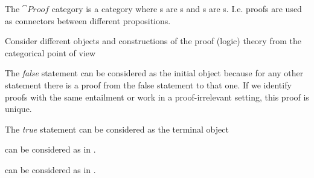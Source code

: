 \begin{definition}
\label{def:proof_category}
The $\cat{Proof}$ category is a category where s are
s and s are
s. I.e. proofs are used as connectors between
different propositions.
\end{definition}

Consider different objects and constructions of the proof (logic)
theory from the categorical point of view
\begin{example}
\label{ex:proof_initial_object}
The \textit{false} statement can be considered as the initial object
because for any other statement there is a proof from the false
statement to that one. If we identify proofs with the same entailment
or work in a proof-irrelevant setting, this proof is unique.
\end{example}

\begin{example}
\label{ex:proof_terminal_object}
The \textit{true} statement can be considered as the terminal object
\end{example}

\begin{example}
\label{ex:proof_product}
 can be considered as
 in .
\end{example}

\begin{example}
\label{ex:proof_sum}
 can be considered as
 in .
\end{example}


